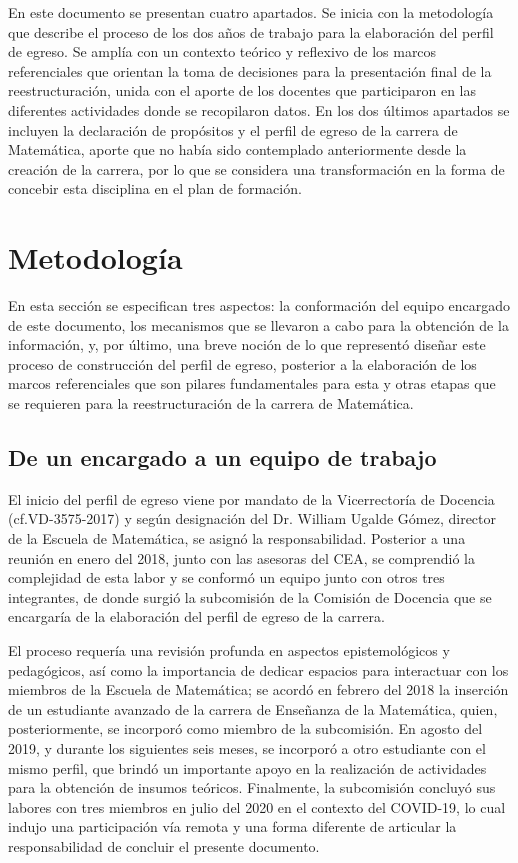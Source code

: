 En este documento se presentan cuatro apartados. Se inicia con la metodología que describe el proceso de los dos años de trabajo para la elaboración del perfil de egreso. Se amplía con un contexto teórico y reflexivo de los marcos referenciales que orientan la toma de decisiones para la presentación final de la reestructuración, unida con el aporte de los docentes que participaron en las diferentes actividades donde se recopilaron datos. En los dos últimos apartados se incluyen la declaración de propósitos y el perfil de egreso de la carrera de Matemática, aporte que no había sido contemplado anteriormente desde la creación de la carrera, por lo que se considera una transformación en la forma de concebir esta disciplina en el plan de formación. 

\section{Metodología}

En esta sección se especifican tres aspectos: la conformación del equipo encargado de este documento, los mecanismos que se llevaron a cabo para la obtención de la información, y, por último, una breve noción de lo que representó diseñar este proceso de construcción del perfil de egreso, posterior a la elaboración de los marcos referenciales que son pilares fundamentales para esta y otras etapas que se requieren para la reestructuración de la carrera de Matemática. 

\subsection{De un encargado a un equipo de trabajo}

El inicio del perfil de egreso viene por mandato de la Vicerrectoría de Docencia (cf.VD-3575-2017) y según designación del Dr. William Ugalde Gómez, director de la Escuela de Matemática, se asignó la responsabilidad. Posterior a una reunión en enero del 2018, junto con las asesoras del CEA, se comprendió la complejidad de esta labor y se conformó un equipo junto con otros tres integrantes, de donde surgió la subcomisión de la Comisión de Docencia que se encargaría de la elaboración del perfil de egreso de la carrera. 

El proceso requería una revisión profunda en aspectos epistemológicos y pedagógicos, así como la importancia de dedicar espacios para interactuar con los miembros de la Escuela de Matemática; se acordó en febrero del 2018 la inserción de un estudiante avanzado de la carrera de Enseñanza de la Matemática, quien, posteriormente, se incorporó como miembro de la subcomisión. En agosto del 2019, y durante los siguientes seis meses, se incorporó a otro estudiante con el mismo perfil, que brindó un importante apoyo en la realización de actividades para la obtención de insumos teóricos. Finalmente, la subcomisión concluyó sus labores con tres miembros en julio del 2020 en el contexto del COVID-19, lo cual indujo una participación vía remota y una forma diferente de articular la responsabilidad de concluir el presente documento. 


